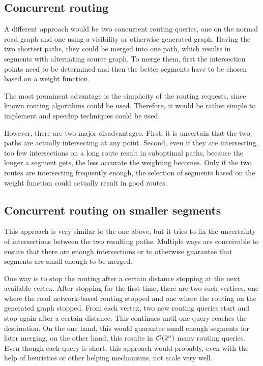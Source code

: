 	\subsection{Concurrent routing}
	
		A different approach would be two concurrent routing queries, one on the normal road graph and one using a visibility or otherwise generated graph.
		Having the two shortest paths, they could be merged into one path, which results in segments with alternating source graph.
		To merge them, first the intersection points need to be determined and then the better segments have to be chosen based on a weight function.
		
		The most prominent advantage is the simplicity of the routing requests, since known routing algorithms could be used.
		Therefore, it would be rather simple to implement and speedup techniques could be used.
		
		However, there are two major disadvantages.
		First, it is uncertain that the two paths are actually intersecting at any point.
		Second, even if they are intersecting, too few intersections on a long route result in suboptimal paths, because the longer a segment gets, the less accurate the weighting becomes.
		Only if the two routes are intersecting frequently enough, the selection of segments based on the weight function could actually result in good routes.
	
	\subsection{Concurrent routing on smaller segments}
	
		This approach is very similar to the one above, but it tries to fix the uncertainty of intersections between the two resulting paths.
		Multiple ways are conceivable to ensure that there are enough intersections or to otherwise guarantee that segments are small enough to be merged.
		
		One way is to stop the routing after a certain distance stopping at the next available vertex.
		After stopping for the first time, there are two such vertices, one where the road network-based routing stopped and one where the routing on the generated graph stopped.
		From each vertex, two new routing queries start and stop again after a certain distance.
		This continues until one query reaches the destination.
		On the one hand, this would guarantee small enough segments for later merging, on the other hand, this results in $\mathcal{O}(2^n)$ many routing queries.
		Even though each query is short, this approach would probably, even with the help of heuristics or other helping mechanisms, not scale very well.
		
